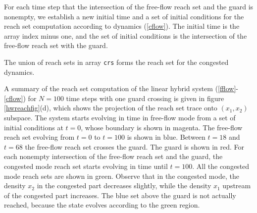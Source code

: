 For each time step that the intersection of the free-flow reach set and the
guard is nonempty, we establish a new initial time and a set of initial
conditions for the reach set computation according to dynamics (\ref{cflow}).
The initial time is the array index minus one, and the set of initial
conditions is the intersection of the free-flow reach set with the guard.

The union of reach sets in array {\tt crs} forms the reach set for
the congested dynamics.

A summary of
 the reach set computation of the
linear hybrid system (\ref{fflow}-\ref{cflow}) for $N=100$ time steps
with one guard crossing is given in figure \ref{hwreachfig}(d),
which shows the projection of the reach set trace onto $(x_1,x_2)$ subspace.
The system starts evolving in time in free-flow mode from a set of
initial conditions at $t=0$, whose boundary is shown in magenta.
The free-flow reach set evolving from $t=0$ to $t=100$ is shown in blue.
Between  $t=18$ and $t=68$ the free-flow reach set crosses the guard.
The guard is shown in red.
For each  nonempty intersection of the free-flow reach set and the guard,
the congested mode reach set starts evolving in time until $t=100$.
All the congested mode reach sets are shown in green.
Observe that in the congested mode, the density $x_2$ in the congested part
 decreases slightly, while the density $x_1$ upstream of the congested part
 increases.
The blue  set above the guard is not actually reached,
because the state evolves according to the green region.
